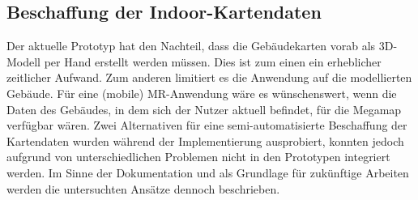 \subsection*{Beschaffung der Indoor-Kartendaten}
Der aktuelle Prototyp hat den Nachteil, dass die Gebäudekarten vorab als 3D-Modell per Hand erstellt werden müssen.
Dies ist zum einen ein erheblicher zeitlicher Aufwand.
Zum anderen limitiert es die Anwendung auf die modellierten Gebäude.
Für eine (mobile) MR-Anwendung wäre es wünschenswert, wenn die Daten des Gebäudes, in dem sich der Nutzer aktuell befindet, für die Megamap verfügbar wären.
Zwei Alternativen für eine semi-automatisierte Beschaffung der Kartendaten wurden während der Implementierung ausprobiert, konnten jedoch aufgrund von unterschiedlichen Problemen nicht in den Prototypen integriert werden.
Im Sinne der Dokumentation und als Grundlage für zukünftige Arbeiten werden die untersuchten Ansätze dennoch beschrieben.

